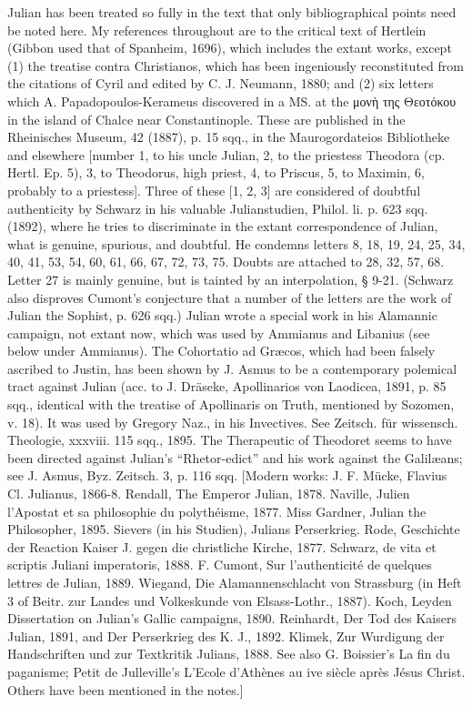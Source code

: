 Julian has been treated so fully in the text that only bibliographical points need be noted here. My references throughout are to the critical text of Hertlein (Gibbon used that of Spanheim, 1696), which includes the extant works, except (1) the treatise contra Christianos, which has been ingeniously reconstituted from the citations of Cyril and edited by C. J. Neumann, 1880; and (2) six letters which A. Papadopoulos-Kerameus discovered in a MS. at the \textgreek{μον\texthebrew{ὴ} της Θεοτόκου} in the island of Chalce near Constantinople. These are published in the Rheinisches Museum, 42 (1887), p. 15 sqq., in the Maurogordateios Bibliotheke and elsewhere [number 1, to his uncle Julian, 2, to the priestess Theodora (cp. Hertl. Ep. 5), 3, to Theodorus, high priest, 4, to Priscus, 5, to Maximin, 6, probably to a priestess]. Three of these [1, 2, 3] are considered of doubtful authenticity by Schwarz in his valuable Julianstudien, Philol. li. p. 623 sqq. (1892), where he tries to discriminate in the extant correspondence of Julian, what is genuine, spurious, and doubtful. He condemns letters 8, 18, 19, 24, 25, 34, 40, 41, 53, 54, 60, 61, 66, 67, 72, 73, 75. Doubts are attached to 28, 32, 57, 68. Letter 27 is mainly genuine, but is tainted by an interpolation, § 9-21. (Schwarz also disproves Cumont\texthebrew{}’s conjecture that a number of the letters are the work of Julian the Sophist, p. 626 sqq.) Julian wrote a special work in his Alamannic campaign, not extant now, which was used by Ammianus and Libanius (see below under Ammianus). The Cohortatio ad Græcos, which had been falsely ascribed to Justin, has been shown by J. Asmus to be a contemporary polemical tract against Julian (acc. to J. Dräseke, Apollinarios von Laodicea, 1891, p. 85 sqq., identical with the treatise of Apollinaris on Truth, mentioned by Sozomen, v. 18). It was used by Gregory Naz., in his Invectives. See Zeitsch. für wissensch. Theologie, xxxviii. 115 sqq., 1895. The Therapeutic of Theodoret seems to have been directed against Julian\texthebrew{}’s \texthebrew{“}Rhetor-edict\texthebrew{}” and his work against the Galilæans; see J. Asmus, Byz. Zeitsch. 3, p. 116 sqq. [Modern works: J. F. Mücke, Flavius Cl. Julianus, 1866-8. Rendall, The Emperor Julian, 1878. Naville, Julien l\texthebrew{}’Apostat et sa philosophie du polythéisme, 1877. Miss Gardner, Julian the Philosopher, 1895. Sievers (in his Studien), Julians Perserkrieg. Rode, Geschichte der Reaction Kaiser J. gegen die christliche Kirche, 1877. Schwarz, de vita et scriptis Juliani imperatoris, 1888. F. Cumont, Sur l\texthebrew{}’authenticité de quelques lettres de Julian, 1889. Wiegand, Die Alamannenschlacht von Strassburg (in Heft 3 of Beitr. zur Landes und Volkeskunde von Elsass-Lothr., 1887). Koch, Leyden Dissertation on Julian\texthebrew{}’s Gallic campaigns, 1890. Reinhardt, Der Tod des Kaisers Julian, 1891, and Der Perserkrieg des K. J., 1892. Klimek, Zur Wurdigung der Handschriften und zur Textkritik Julians, 1888. See also G. Boissier\texthebrew{}’s La fin du paganisme; Petit de Julleville\texthebrew{}’s L\texthebrew{}’Ecole d\texthebrew{}’Athènes au ive siècle après Jésus Christ. Others have been mentioned in the notes.]

